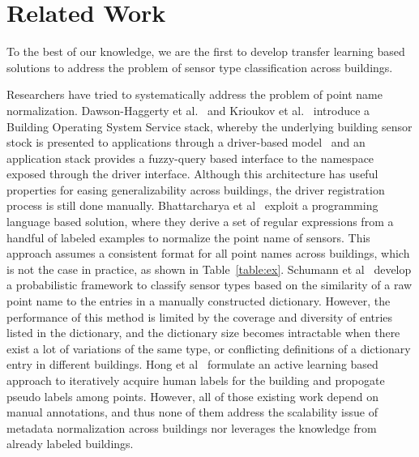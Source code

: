 \section{Related Work}
To the best of our knowledge, we are the first to develop transfer learning based solutions to address the problem of sensor type classification across buildings.

Researchers have tried to systematically address the problem of point name normalization.
Dawson-Haggerty et al.~\cite{boss} and Krioukov et al.~\cite{bas}
introduce a Building Operating System Service stack, whereby
the underlying building sensor stock is presented to applications through a driver-based model \
and an application stack provides a fuzzy-query based interface to the namespace exposed
through the driver interface.
Although this architecture has useful properties for easing generalizability across
buildings, the driver registration process is still done manually.
Bhattarcharya et al~\cite{arka} exploit a programming language based solution,
where they derive a set of regular expressions from a handful of labeled examples
to normalize the point name of sensors.
This approach assumes a consistent format for all point names across buildings, which is not the case in practice, as shown in Table~\ref{table:ex}.
Schumann et al~\cite{ibm} develop a probabilistic framework to classify sensor types
based on the similarity of a raw point name to the entries in a manually constructed dictionary.
However, the performance of this method is limited by the coverage and diversity of entries listed in the dictionary, and the dictionary size becomes intractable when there exist a lot of variations of the same type, or conflicting definitions of a dictionary entry in different buildings.
Hong et al~\cite{cikm} formulate an active learning based approach to iteratively
acquire human labels for the building and propogate pseudo labels among points.
However, all of those existing work depend on manual annotations, and thus none of them address the scalability issue of metadata
normalization across buildings nor leverages the knowledge from already labeled buildings.

